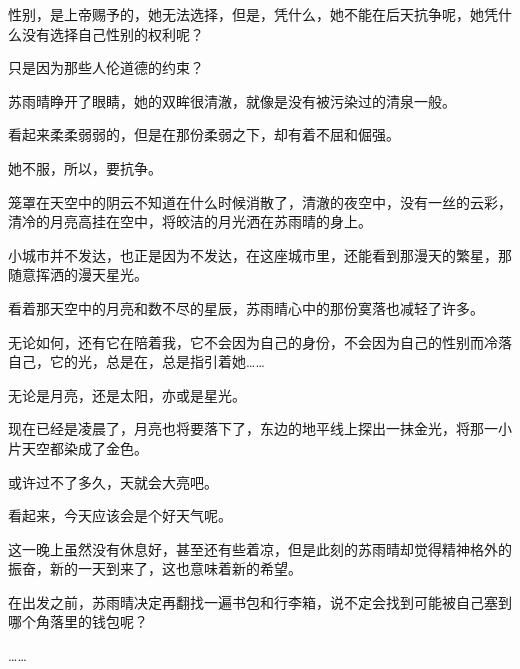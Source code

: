 性别，是上帝赐予的，她无法选择，但是，凭什么，她不能在后天抗争呢，她凭什么没有选择自己性别的权利呢？

只是因为那些人伦道德的约束？

苏雨晴睁开了眼睛，她的双眸很清澈，就像是没有被污染过的清泉一般。

看起来柔柔弱弱的，但是在那份柔弱之下，却有着不屈和倔强。

她不服，所以，要抗争。

笼罩在天空中的阴云不知道在什么时候消散了，清澈的夜空中，没有一丝的云彩，清冷的月亮高挂在空中，将皎洁的月光洒在苏雨晴的身上。

小城市并不发达，也正是因为不发达，在这座城市里，还能看到那漫天的繁星，那随意挥洒的漫天星光。

看着那天空中的月亮和数不尽的星辰，苏雨晴心中的那份寞落也减轻了许多。

无论如何，还有它在陪着我，它不会因为自己的身份，不会因为自己的性别而冷落自己，它的光，总是在，总是指引着她……

无论是月亮，还是太阳，亦或是星光。

现在已经是凌晨了，月亮也将要落下了，东边的地平线上探出一抹金光，将那一小片天空都染成了金色。

或许过不了多久，天就会大亮吧。

看起来，今天应该会是个好天气呢。

这一晚上虽然没有休息好，甚至还有些着凉，但是此刻的苏雨晴却觉得精神格外的振奋，新的一天到来了，这也意味着新的希望。

在出发之前，苏雨晴决定再翻找一遍书包和行李箱，说不定会找到可能被自己塞到哪个角落里的钱包呢？

……
